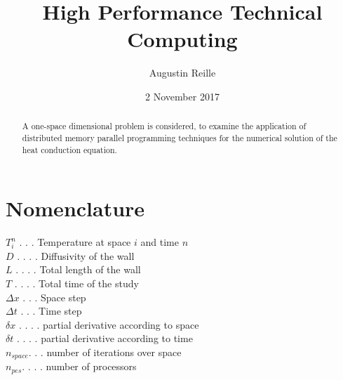 \documentclass{article}
\title{High Performance Technical Computing}
\author{Augustin Reille}
\date{2 November 2017}
\begin{document}
        \maketitle
    
        \begin{abstract}
            A one-space dimensional problem is considered, to examine the application
            of distributed memory parallel programming techniques for the numerical 
            solution of the heat conduction equation.
        \end{abstract}
    
        \newpage
        \tableofcontents
    
        \newpage
        \listoffigures
    
        \listoftables
    
        \lstlistoflistings
    
        \section*{Nomenclature}
            $T_i^n$ . . . Temperature at space $i$ and time $n$\\
            $D$ . . . . Diffusivity of the wall\\
            $L$ . . . . Total length of the wall\\
            $T$ . . . . Total time of the study\\
            $\Delta x$ . . . Space step\\
            $\Delta t$ . . . Time step\\
            $\delta x$ . . . . partial derivative according to space\\
            $\delta t$ . . . . partial derivative according to time\\
            $n_{space}$. . .  number of iterations over space\\
            $n_{pes}$. . . . number of processors\\
        \newpage
\end{document}
